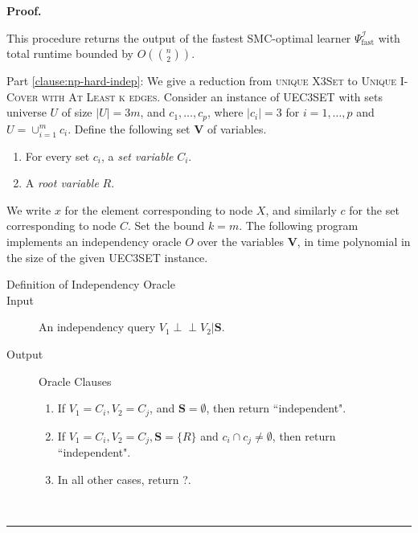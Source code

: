 \documentclass{elsarticle}%
\renewenvironment{proof}[1][Proof]{\noindent\textbf{#1.} }{\ \rule{0.5em}{0.5em}}
\newcommand{\indep}{\ensuremath{\perp{}\!\!\!\!\!\!\!\perp{}}}
\newcommand{\V}{\mathbf{V}}
\renewcommand{\S}{\mathbf{{S}}}
\newcommand{\R}{R}
\newcommand{\X}{X}
\newcommand{\C}{C}
\newcommand{\fast}{\mathrm{fast}}
\newcommand{\I}{\mathcal{I}}
\renewcommand{\c}{c}
\newcommand{\x}{x}
\begin{document}
\begin{proof}
\begin{enumerate}
\end{enumerate}
This procedure returns the output of the fastest SMC-optimal learner $\Psi^{\I}_{\fast}$ with total runtime bounded by $O(\binom{n}{2})$.

Part \ref{clause:np-hard-indep}:
We give a reduction from \textsc{unique X3Set} to \textsc{Unique I-Cover
with At Least k edges}. Consider an instance of \textsc{UEC3SET} with sets
universe $U$ of size $|U|=3m$, and $c_{1},\ldots,c_{p}$, where $|c_{i}|=3$ for
$i=1,\ldots,p$ and $U=\cup_{i=1}^{m}c_{i}$. Define the following set $\V$ of variables.

\begin{enumerate}
\item For every set $c_{i}$, a {\em set variable} $C_{i}$.


\item A {\em root variable} $R$.
\end{enumerate}
We write $\x$ for the element corresponding to node $\X$, and similarly $\c$ for the set corresponding to node $\C$. 
Set the bound $k=m$. The following program implements an
independency oracle $O$ over the variables $\V$, in time polynomial in the size of the given \textsc{UEC3SET} instance.

\begin{description}
\item[Definition of Independency Oracle]
\item[Input] An independency query $V_1 \indep V_2 | \S$.

\item[Output] Oracle Clauses

\begin{enumerate}
\item If $V_{1}=\C_{i},V_{2}=\C
_{j}$, and $\S=\emptyset$, then return ``independent". \label{clause:noedge-sets}
\item If $V_{1}=\C_{i},V_{2}=\C_{j},\S=\{\R\}$ and $\c_i \cap \c_j \neq \emptyset$, then return ``independent". \label{clause:colliders}
\item In all other cases, return ?.
\end{enumerate}


\end{description}
\end{proof}
\end{document}
